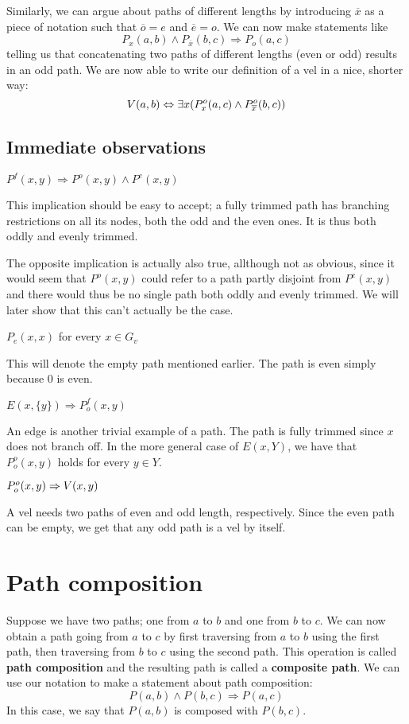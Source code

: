 Similarly, we can argue about paths of different lengths by introducing $\overline{x}$ as a piece of notation such that $\overline{o} = e$ and $\overline{e} = o$.
We can now make statements like \[P_x(a,b) \wedge P_{\overline{x}}(b,c) \Rightarrow P_o(a,c)\] telling us that concatenating two paths of different lengths (even or odd) results in an odd path.
We are now able to write our definition of a vel in a nice, shorter way:
\[
V(a,b) \Leftrightarrow \exists x(P^o_x(a,c) \wedge P^o_{\overline{x}}(b,c))
\]
\subsection{Immediate observations}
\label{sub:Immediate observations}
\begin{lemma}
  $P^f(x,y) \Rightarrow P^o(x,y) \wedge P^e(x,y)$
\end{lemma}
 This implication should be easy to accept; a fully trimmed path has branching restrictions on all its nodes, both the odd and the even ones.
 It is thus both oddly and evenly trimmed.

 The opposite implication is actually also true, allthough not as obvious, since it would seem that $P^o(x,y)$ could refer to a path partly disjoint from $P^e(x,y)$ and there would thus be no single path both oddly and evenly trimmed.
 We will later show that this can't actually be the case.
\begin{lemma}
  $P_e(x,x)$ for every $x \in G_v$
\end{lemma}
This will denote the empty path mentioned earlier.
The path is even simply because 0 is even.
\begin{lemma}
  $E(x,\{ y \}) \Rightarrow P^f_o(x,y)$
\end{lemma}
An edge is another trivial example of a path.
The path is fully trimmed since $x$ does not branch off.
In the more general case of $E(x,Y)$, we have that $P^o_o(x,y)$ holds for every $y \in Y$.
\begin{lemma}
  $P^o_o(x,y) \Rightarrow V(x,y)$
\end{lemma}
A vel needs two paths of even and odd length, respectively.
Since the even path can be empty, we get that any odd path is a vel by itself.
\section{Path composition}
\label{sec:Path composition}
Suppose we have two paths; one from $a$ to $b$ and one from $b$ to $c$.
We can now obtain a path going from $a$ to $c$ by first traversing from $a$ to $b$ using the first path, then traversing from $b$ to $c$ using the second path.
This operation is called \textbf{path composition} and the resulting path is called a \textbf{composite path}.
We can use our notation to make a statement about path composition:
\[
P(a,b) \wedge P(b,c) \Rightarrow P(a,c)
\]
In this case, we say that $P(a,b)$ is composed with $P(b,c)$.


